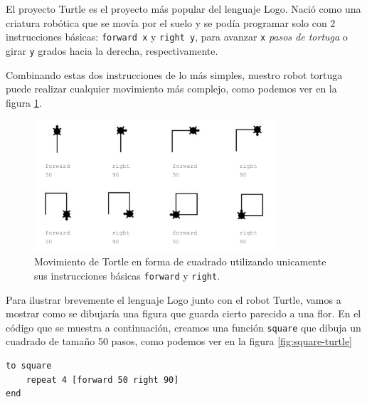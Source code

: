 
El proyecto Turtle es el proyecto más popular del lenguaje Logo. Nació como una criatura robótica que se movía por el suelo y se podía programar solo con 2 instrucciones básicas: \texttt{forward x} y \texttt{right y}, para avanzar \texttt{x} \emph{pasos de tortuga} o girar \texttt{y} grados hacia la derecha, respectivamente.

Combinando estas dos instrucciones de lo más simples, nuestro robot tortuga puede realizar cualquier movimiento más complejo, como podemos ver en la figura \ref{fig:mov-tortle}.

\begin{figure}[!ht]
	\begin{centering}
		\includegraphics[width=0.8\textwidth]{images/mov-tortle.png}
			\caption{Movimiento de Tortle en forma de cuadrado utilizando unicamente sus instrucciones básicas \texttt{forward} y \texttt{right}.}
				\label{fig:mov-tortle}
	\end{centering}
\end{figure}

Para ilustrar brevemente el lenguaje Logo junto con el robot Turtle, vamos a mostrar como se dibujaría una figura que guarda cierto parecido a una flor.
En el código que se muestra a continuación, creamos una función \texttt{square} que dibuja un cuadrado de tamaño 50 pasos, como podemos ver en la figura \ref{fig:square-turtle}

\begin{lstlisting}
to square
	repeat 4 [forward 50 right 90]
end
\end{lstlisting}

